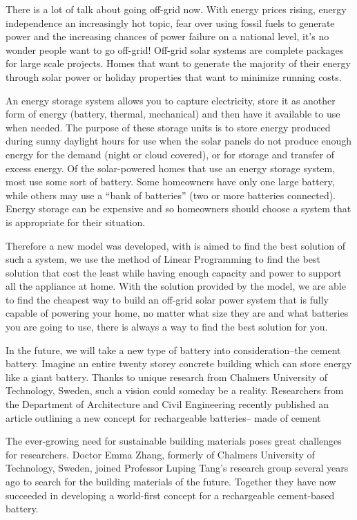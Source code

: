 \documentclass[UTF-8]{article}
\begin{document}
     There is a lot of talk about going off-grid now. With energy prices rising, 
    energy independence an increasingly hot topic, fear over using fossil fuels to generate power
     and the increasing chances of power failure on a national level, it's no wonder people want to go off-grid!
    Off-grid solar systems are complete packages for large scale projects. Homes 
    that want to generate the majority of their energy through solar power or holiday
     properties that want to minimize running costs.\par
    An energy storage system allows you to capture electricity, store it as another
   form of energy (battery, thermal, mechanical) and then have it available to use
   when needed. The purpose of these storage units is to store energy produced during
   sunny daylight hours for use when the solar panels do not produce enough energy
  for the demand (night or cloud covered), or for storage and transfer of excess energy.
  Of the solar-powered homes that use an energy storage system, most use some sort
  of battery. Some homeowners have only one large battery, while others may use
  a “bank of batteries” (two or more batteries connected). Energy storage can be
  expensive and so homeowners should choose a system that is appropriate for their
  situation.\par
  Therefore a new model was developed, with is aimed to find the best solution of such a system, we use the method of Linear Programming to find the best solution that cost the least while having enough capacity and 
  power to support all the appliance at home. With the solution provided by the model, we are able to find the cheapest way to build an off-grid 
  solar power system that is fully capable of powering your home, no matter what size they are and what batteries you are going to use, there is always a way to find the best solution for you.\par
        In the future, we will take a new type of battery into consideration--the cement battery. Imagine an entire twenty storey concrete building which can store energy like a giant battery. 
        Thanks to unique research from Chalmers University of Technology, Sweden, such a vision 
        could someday be a reality. Researchers from the Department of Architecture and 
        Civil Engineering recently published an article outlining a new concept for rechargeable
         batteries-- made of cement \par The ever-growing need for sustainable building materials poses great challenges for researchers. Doctor Emma Zhang, formerly of Chalmers University of Technology, Sweden, joined Professor Luping Tang’s research group several years ago to search for the building materials of the future. Together they have now succeeded in developing a world-first concept for a rechargeable cement-based battery. \par 
\end{document}
